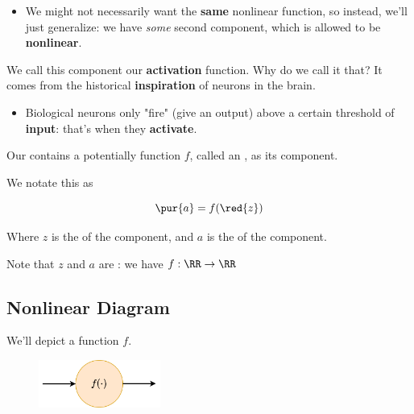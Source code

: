         \begin{itemize}
            \item We might not necessarily want the \textbf{same} nonlinear function, so instead, we'll just generalize: we have \textit{some} second component, which is allowed to be \textbf{nonlinear}.
        \end{itemize}
        
        
        We call this component our \textbf{activation} function. Why do we call it that? It comes from the historical \textbf{inspiration} of neurons in the brain.
        
        \begin{itemize}
            \item Biological neurons only "fire" (give an output) above a certain threshold of \textbf{input}: that's when they \textbf{activate}.
            \\
        \end{itemize}
        
            
        \begin{definition}
            Our  contains a potentially  function $f$, called an , as its  component.
            
            We notate this as 
            
            \begin{equation*}
                \pur{a} = f(\red{z})
            \end{equation*}
            
            Where $z$ is the  of the  component, and $a$ is the  of the  component.
            
            Note that $z$ and $a$ are : we have $f: \RR \rightarrow \RR$
            
        \end{definition}
    
    \subsection{Nonlinear Diagram}
    
        We'll depict a function $f$.

        \begin{figure}[H]
            \centering
            \includegraphics[width=40mm,scale=0.4]{images/nn_images/nonlinear_func.png}
        \end{figure}
        
